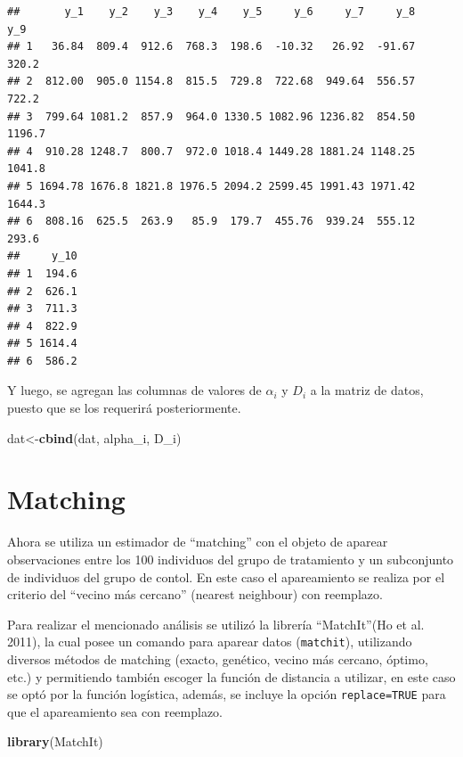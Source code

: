 \documentclass[]{article}
\newenvironment{Shaded}{\begin{snugshade}}{\end{snugshade}}
\newcommand{\KeywordTok}[1]{\textcolor[rgb]{0.13,0.29,0.53}{\textbf{{#1}}}}
\newcommand{\NormalTok}[1]{{#1}}
\begin{document}
\begin{verbatim}
##       y_1    y_2    y_3    y_4    y_5     y_6     y_7     y_8    y_9
## 1   36.84  809.4  912.6  768.3  198.6  -10.32   26.92  -91.67  320.2
## 2  812.00  905.0 1154.8  815.5  729.8  722.68  949.64  556.57  722.2
## 3  799.64 1081.2  857.9  964.0 1330.5 1082.96 1236.82  854.50 1196.7
## 4  910.28 1248.7  800.7  972.0 1018.4 1449.28 1881.24 1148.25 1041.8
## 5 1694.78 1676.8 1821.8 1976.5 2094.2 2599.45 1991.43 1971.42 1644.3
## 6  808.16  625.5  263.9   85.9  179.7  455.76  939.24  555.12  293.6
##     y_10
## 1  194.6
## 2  626.1
## 3  711.3
## 4  822.9
## 5 1614.4
## 6  586.2
\end{verbatim}

Y luego, se agregan las columnas de valores de $\alpha_{i}$ y $D_{i}$ a
la matriz de datos, puesto que se los requerirá posteriormente.

\begin{Shaded}
\begin{Highlighting}[]
\NormalTok{dat<-}\KeywordTok{cbind}\NormalTok{(dat, alpha_i, D_i)}
\end{Highlighting}
\end{Shaded}

\section{Matching}\label{matching}

Ahora se utiliza un estimador de ``matching'' con el objeto de aparear
observaciones entre los 100 individuos del grupo de tratamiento y un
subconjunto de individuos del grupo de contol. En este caso el
apareamiento se realiza por el criterio del ``vecino más cercano''
(nearest neighbour) con reemplazo.

Para realizar el mencionado análisis se utilizó la librería
``MatchIt''(Ho et al. 2011), la cual posee un comando para aparear datos
(\texttt{matchit}), utilizando diversos métodos de matching (exacto,
genético, vecino más cercano, óptimo, etc.) y permitiendo también
escoger la función de distancia a utilizar, en este caso se optó por la
función logística, además, se incluye la opción \texttt{replace=TRUE}
para que el apareamiento sea con reemplazo.

\begin{Shaded}
\begin{Highlighting}[]
\KeywordTok{library}\NormalTok{(MatchIt)}
\end{Highlighting}
\end{Shaded}
\end{document}
